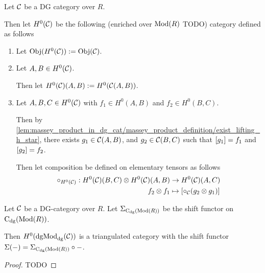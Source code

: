 \begin{definition}
    Let \( {\mathcal{C}} \) be a DG category over \( R \).

    Then let \( H^0({\mathcal{C}}) \) be the following (enriched over \( \operatorname{Mod}(R) \) TODO) category defined as follows
    \begin{enumerate}
        \item {
            Let \( \operatorname{Obj}(H^0({\mathcal{C}})) := \operatorname{Obj}({\mathcal{C}}) \).
        }
        \item {
            Let \( A, B \in H^0({\mathcal{C}}) \).

            Then let \( H^0({\mathcal{C}})(A, B) := H^0({\mathcal{C}}(A, B)) \).
        }
        \item {
            Let \( A, B, C \in H^0({\mathcal{C}}) \) with \( f_1 \in H^0(A, B) \) and \( f_2 \in H^0(B, C) \).

            Then by \autoref{lem:massey_product_in_dg_cat/massey_product_definition/exist_lifting_h_star}, there exists \( g_1 \in {\mathcal{C}}(A, B) \), and \( g_2 \in {\mathcal{C}}(B, C) \) such that \( [g_1] = f_1 \) and \( [g_2] = f_2 \).

            Then let composition be defined on elementary tensors as follows
            \begin{align*}
                \circ_{H^0({\mathcal{C}})}: H^0({\mathcal{C}})(B, C) \otimes H^0({\mathcal{C}})(A, B) &\to H^0({\mathcal{C}})(A, C) \\
                f_2 \otimes f_1 &\mapsto [ \circ_{{\mathcal{C}}}(g_2 \otimes g_1) ]
            \end{align*}
        }
    \end{enumerate}
\end{definition}

\begin{theorem}
    Let \( {\mathcal{C}} \) be a DG-category over \( R \). Let \( \Sigma_{\operatorname{C}_{\operatorname{dg}}(\operatorname{Mod}(R))} \) be the shift functor on \( \operatorname{C}_{\operatorname{dg}}(\operatorname{Mod}(R)) \).

    Then \( H^0(\operatorname{dgMod}_{\operatorname{dg}}({\mathcal{C}})) \) is a triangulated category with the shift functor \( \Sigma(-) = \Sigma_{\operatorname{C}_{\operatorname{dg}}(\operatorname{Mod}(R))} \circ - \).
\end{theorem}
\begin{proof}
    TODO
\end{proof}

